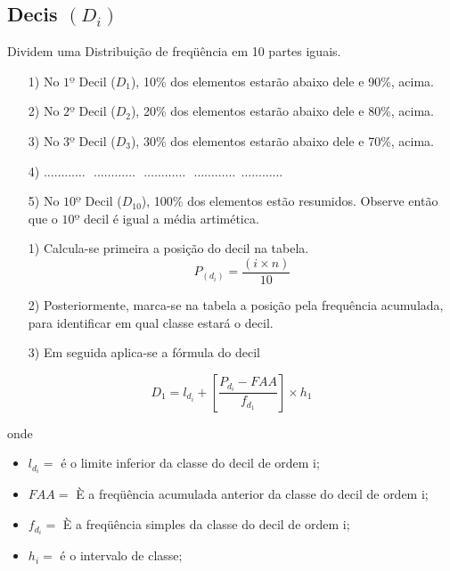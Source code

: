 \subsection{Decis $(D_{i})$}

Dividem uma Distribuição de freqüência em 10 partes iguais.


\begin{enumerate}
  \item[{1)}] No $1º$ Decil ($D_{1}$), 10\% dos elementos estarão abaixo dele e 90\%, acima.
  \item[{2)}] No $2º$ Decil ($D_{2}$), 20\% dos elementos estarão abaixo dele e 80\%, acima.
  \item[{3)}] No $3º$ Decil ($D_{3}$), 30\% dos elementos estarão abaixo dele e 70\%, acima.
  \item[{4)}] $\ldots \ldots \ldots \ldots \ \ \  \ldots \ldots \ldots \ldots \ \ \  \ldots \ldots \ldots \ldots \ \ \  \ldots \ldots \ldots \ldots \ \ \ldots \ldots \ldots \ldots$
 \item[{5)}] No $10º$ Decil ($D_{10}$), 100\% dos elementos estão resumidos. Observe então que o $10º$ decil é igual a média artimética.
\end{enumerate}

\begin{enumerate}
\item [{1)}]Calcula-se primeira a posição do decil na tabela.
$$ P_{(d_{i})}=\frac{(i \times n)}{10}$$
\item [{2)}] Posteriormente, marca-se na tabela a posição pela frequência acumulada, para identificar em qual classe estará o decil.
\item [{3)}] Em seguida aplica-se a fórmula do decil
\end{enumerate}

\begin{equation}\label{}
    D_{1}= l_{d_{i}}+\left[\frac{P_{d_{i}}-FAA}{f_{d_{1}}}\right]\times h_{1}
\end{equation}

 onde

 \begin{itemize}
   \item $l_{d_{i}}=$ é o limite inferior da classe do decil de ordem i;
   \item $FAA=$ È a freqüência acumulada anterior da classe do decil de ordem i;
   \item $f_{d_{i}}=$ È a freqüência simples da classe do decil de ordem i;
   \item $h_{i}=$ é o intervalo de classe;
 \end{itemize}



